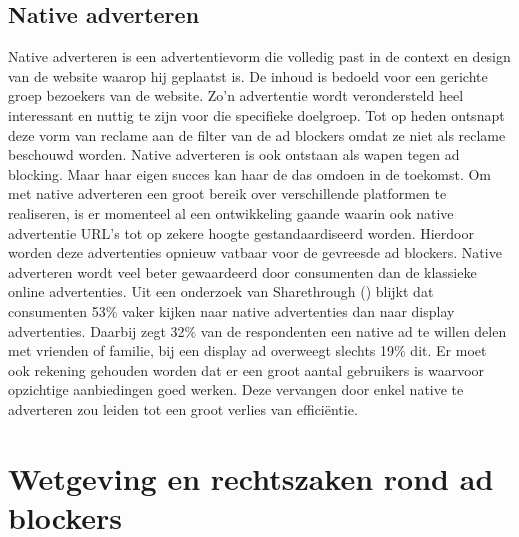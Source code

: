 \documentclass[pdftex,a4paper,12pt,twoside]{report}
\begin{document}
\section{Native adverteren}
\label{sec Native adverteren}
Native adverteren is een advertentievorm die volledig past in de context en design van de website waarop hij geplaatst is. De inhoud is bedoeld voor een gerichte groep bezoekers van de website. Zo’n advertentie wordt verondersteld heel interessant en nuttig te zijn voor die specifieke doelgroep. Tot op heden ontsnapt deze vorm van reclame aan de filter van de ad blockers omdat ze niet als reclame beschouwd worden. Native adverteren is ook ontstaan als wapen tegen ad blocking. Maar haar eigen succes kan haar de das omdoen in de toekomst. Om met native adverteren een groot bereik over verschillende platformen te realiseren, is er momenteel al een ontwikkeling gaande waarin ook native advertentie URL's tot op zekere hoogte gestandaardiseerd worden. Hierdoor worden deze advertenties opnieuw vatbaar voor de gevreesde ad blockers. 
Native adverteren wordt veel beter gewaardeerd door consumenten dan de klassieke online advertenties. Uit een onderzoek van Sharethrough (\cite{ShareThrough2013}) blijkt dat consumenten 53\% vaker kijken naar native advertenties dan naar display advertenties. Daarbij zegt 32\% van de respondenten een native ad te willen delen met vrienden of familie, bij een display ad overweegt slechts 19\% dit.
Er moet ook rekening gehouden worden dat er een groot aantal gebruikers is waarvoor opzichtige aanbiedingen goed werken. Deze vervangen door enkel native te adverteren zou leiden tot een groot verlies van efficiëntie.


\chapter{Wetgeving en rechtszaken rond ad blockers}
\label{ch: Wetgevingen en rechtzaken rond ad blockers}
\end{document}
